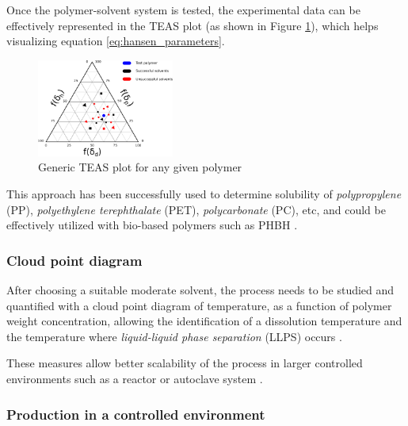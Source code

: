 \documentclass[a4paper]{article}
\begin{document}
    Once the polymer-solvent system is tested, the experimental data can be effectively represented in the TEAS plot (as shown in Figure \ref{fig:TEAS_plot}), which 
    helps visualizing equation \ref{eq:hansen_parameters}. 

    \begin{figure}[ht]
        \centering
        \includegraphics[width=0.4\textwidth]{Pictures/TEAS_plot.eps}
        \caption{Generic TEAS plot for any given polymer \autocites{DechetMaximilianA2020OtDo}}
        \label{fig:TEAS_plot}
    \end{figure}


    This approach has been successfully used to determine solubility of \textit{polypropylene} (PP), \textit{polyethylene terephthalate} (PET), 
    \textit{polycarbonate} (PC), etc, and could be effectively utilized with bio-based polymers such as PHBH \autocites{DechetMaximilianA2020OtDo}.
    
    

    \subsubsection{Cloud point diagram \label{Cloud_point_diagram}}

    After choosing a suitable moderate solvent, the process needs to be studied and quantified 
    with a cloud point diagram of temperature, as a function of polymer weight concentration, allowing the identification of a dissolution 
    temperature and the temperature where \textit{liquid-liquid phase separation} (LLPS) occurs \autocites{DechetMaximilianA2020OtDo,Dechet_Schmidt_PA11_precipitation_LLPS}. 
    
    These measures allow better scalability of the process in larger controlled environments such as a reactor or autoclave system \autocite{DechetMaximilianA2020OtDo}.
    
    \subsubsection{Production in a controlled environment \label{precipitation_production_controlled_environment}}
\end{document}

